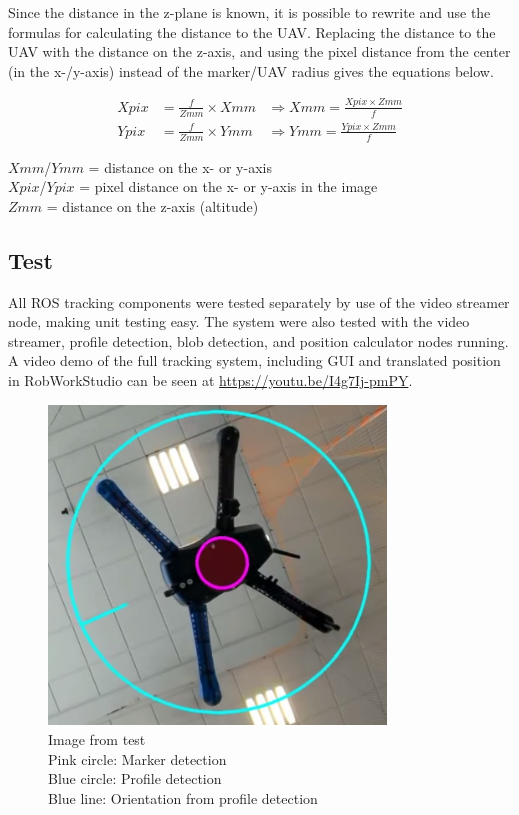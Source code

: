 Since the distance in the z-plane is known, it is possible to rewrite and use the formulas for calculating the distance to the UAV. Replacing the distance to the UAV with the distance on the z-axis, and using the pixel distance from the center (in the x-/y-axis) instead of the marker/UAV radius gives the equations below.

\begin{align}
\mathit{Xpix}&= \frac{f}{\mathit{Zmm}}\times \mathit{Xmm} &\Rightarrow \mathit{Xmm}=\frac{\mathit{Xpix}\times \mathit{Zmm}}{f}\nonumber\\
\mathit{Ypix}&= \frac{f}{\mathit{Zmm}}\times \mathit{Ymm} &\Rightarrow \mathit{Ymm}=\frac{\mathit{Ypix}\times \mathit{Zmm}}{f}\nonumber
\end{align}
\begin{center}
	$\mathit{Xmm}$/$\mathit{Ymm}$ = distance on the x- or y-axis\\
	$\mathit{Xpix}$/$\mathit{Ypix}$ = pixel distance on the x- or y-axis in the image\\
	$\mathit{Zmm}$ = distance on the z-axis (altitude)
\end{center}
\subsection{Test}
All ROS tracking components were tested separately by use of the video streamer node, making unit testing easy. The system were also tested with the video streamer, profile detection, blob detection, and position calculator nodes running. A video demo of the full tracking system, including GUI and translated position in RobWorkStudio can be seen at \url{https://youtu.be/I4g7Ij-pmPY}.
\begin{figure}
	\centering
	\includegraphics[width=0.8\textwidth]{imgs/tracking-test-indoors}\\
	Image from test\\Pink circle: Marker detection\\
	Blue circle: Profile detection\\Blue line: Orientation from profile detection
\end{figure}
